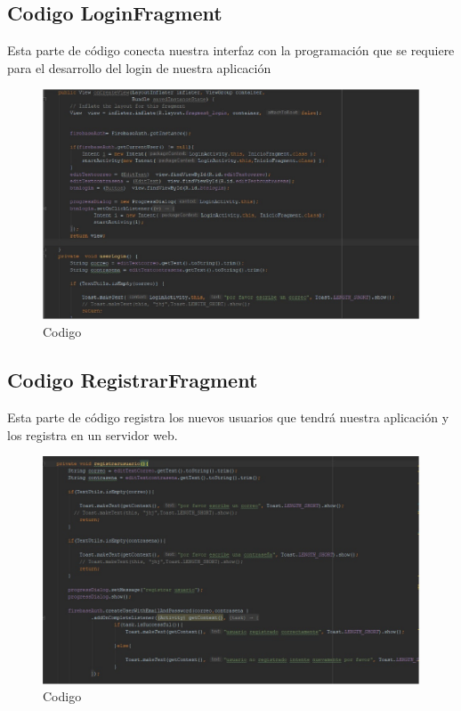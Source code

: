 \subsection{Codigo LoginFragment}
Esta parte de código conecta nuestra interfaz con la programación que se requiere para el desarrollo del login de nuestra aplicación
\begin{figure}[H]
\caption{Codigo}
\centering
\includegraphics[width=13cm]{imagenes/loginactivity}
\end{figure}

\subsection{Codigo RegistrarFragment}
Esta parte de código registra los nuevos usuarios que tendrá nuestra aplicación y los registra en un servidor web.
\begin{figure}[H]
\caption{Codigo}
\centering
\includegraphics[width=13cm]{imagenes/registrarfragment}
\end{figure}


